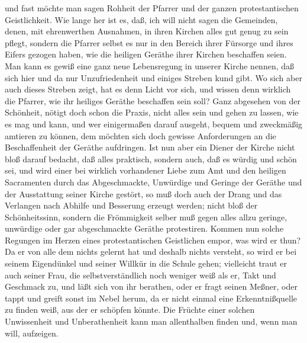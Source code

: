und fast möchte man sagen Rohheit der Pfarrer und der ganzen protestantischen Geistlichkeit. Wie lange her ist es, daß, ich will nicht sagen die Gemeinden, denen, mit ehrenwerthen Ausnahmen, in ihren Kirchen alles gut genug zu sein pflegt, sondern die Pfarrer selbst es nur in den Bereich ihrer Fürsorge und ihres Eifers gezogen haben, wie die heiligen Geräthe ihrer Kirchen beschaffen seien. Man kann es gewiß eine ganz neue Lebensregung in unserer Kirche nennen, daß sich hier und da nur Unzufriedenheit und einiges Streben kund gibt. Wo sich aber auch dieses Streben zeigt, hat es denn Licht vor sich, und wissen denn wirklich die Pfarrer, wie ihr heiliges Geräthe beschaffen sein soll? Ganz abgesehen von der Schönheit, nötigt doch schon die Praxis, nicht alles sein und gehen zu lassen, wie es mag und kann, und wer einigermaßen darauf ausgeht, bequem und zweckmäßig amtieren zu können, dem möchten sich doch gewisse Anforderungen an die Beschaffenheit der Geräthe aufdringen. Ist nun aber ein Diener der Kirche nicht bloß darauf bedacht, daß alles praktisch, sondern auch, daß es würdig und schön sei, und wird einer bei wirklich vorhandener Liebe zum Amt und den heiligen Sacramenten durch das Abgeschmackte, Unwürdige und Geringe der Geräthe und der Ausstattung seiner Kirche gestört, so muß doch auch der Drang und das Verlangen nach Abhilfe und Besserung erzeugt werden; nicht bloß der Schönheitssinn, sondern die Frömmigkeit selber muß gegen alles allzu geringe, unwürdige oder gar abgeschmackte Geräthe protestiren. Kommen nun solche Regungen im Herzen eines protestantischen
Geistlichen empor, was wird er thun? Da er von alle dem nichts gelernt hat und deshalb nichts versteht, so wird er bei seinem Eigendünkel und seiner Willkür in die Schule gehen; vielleicht traut er auch seiner Frau, die selbstverständlich noch weniger weiß als er, Takt und Geschmack zu, und läßt sich von ihr berathen, oder er fragt seinen Meßner, oder tappt und greift sonst im Nebel herum, da er nicht einmal eine Erkenntnißquelle zu finden weiß, aus der er schöpfen könnte. Die Früchte einer solchen Unwissenheit und Unberathenheit kann man allenthalben finden und, wenn man will, aufzeigen.

